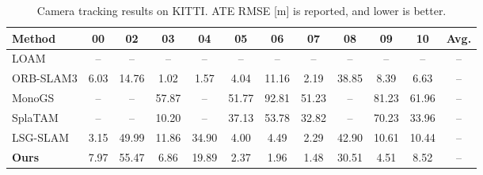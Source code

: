 \begin{table}[t]
\caption{Camera tracking results on KITTI. ATE RMSE [m] is reported, and lower is better.}
\label{tab:kitti_localization}
\centering
\footnotesize
\setlength{\tabcolsep}{4pt}
\begin{tabular}{lccccccccccc}
\toprule
Method & 00 & 02 & 03 & 04 & 05 & 06 & 07 & 08 & 09 & 10 & Avg. \\
\midrule
LOAM & -- & -- & -- & -- & -- & -- & -- & -- & -- & -- & -- \\
ORB-SLAM3 & 6.03 & 14.76 & 1.02 & 1.57 & 4.04 & 11.16 & 2.19 & 38.85 & 8.39 & 6.63 & -- \\
MonoGS & -- & -- & 57.87 & -- & 51.77 & 92.81 & 51.23 & -- & 81.23 & 61.96 & -- \\
SplaTAM & -- & -- & 10.20 & -- & 37.13 & 53.78 & 32.82 & -- & 70.23 & 33.96 & -- \\
LSG-SLAM & 3.15 & 49.99 & 11.86 & 34.90 & 4.00 & 4.49 & 2.29 & 42.90 & 10.61 & 10.44 & -- \\
\textbf{Ours} & 7.97 & 55.47 & 6.86 & 19.89 & 2.37 & 1.96 & 1.48 & 30.51 & 4.51 & 8.52 & -- \\
\bottomrule
\end{tabular}
\end{table}

